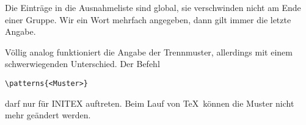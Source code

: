 \begin{appendix}
Die Eintr\"age in die Ausnahmeliste sind 
global, sie verschwinden nicht
am Ende einer Gruppe. Wir ein Wort mehrfach angegeben, dann gilt immer
die letzte Angabe.

V\"ollig analog funktioniert die Angabe der 
Trennmuster, allerdings mit
einem schwerwiegenden Unterschied. Der Befehl
\begin{verbatim}
\patterns{<Muster>}
\end{verbatim}
darf nur f\"ur INITEX auftreten. Beim Lauf von \TeX\ k\"onnen die Muster
nicht mehr ge\"andert werden.
\end{appendix}
\printindex

